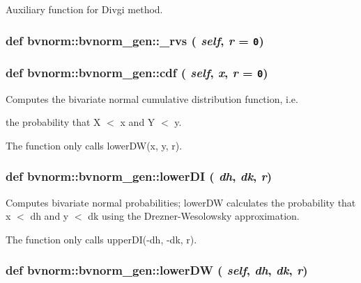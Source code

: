 Auxiliary function for Divgi method. 

\hypertarget{classbvnorm_1_1bvnorm__gen_1f85ab2898c7ce352de4eaa9b47d6817}{
\subsubsection[{\_\-rvs}]{\setlength{\rightskip}{0pt plus 5cm}def bvnorm::bvnorm\_\-gen::\_\-rvs ( {\em self}, \/   {\em r} = {\tt 0})}}
\label{classbvnorm_1_1bvnorm__gen_1f85ab2898c7ce352de4eaa9b47d6817}


\hypertarget{classbvnorm_1_1bvnorm__gen_628377c8e017c5314b8a5ef36db8d892}{
\subsubsection[{cdf}]{\setlength{\rightskip}{0pt plus 5cm}def bvnorm::bvnorm\_\-gen::cdf ( {\em self}, \/   {\em x}, \/   {\em r} = {\tt 0})}}
\label{classbvnorm_1_1bvnorm__gen_628377c8e017c5314b8a5ef36db8d892}


Computes the bivariate normal cumulative distribution function, i.e. 

the probability that X $<$ x and Y $<$ y.

The function only calls lowerDW(x, y, r). \hypertarget{classbvnorm_1_1bvnorm__gen_00b5b765f63ca54c859717b98744d9dc}{
\subsubsection[{lowerDI}]{\setlength{\rightskip}{0pt plus 5cm}def bvnorm::bvnorm\_\-gen::lowerDI ( {\em dh}, \/   {\em dk}, \/   {\em r})}}
\label{classbvnorm_1_1bvnorm__gen_00b5b765f63ca54c859717b98744d9dc}


Computes bivariate normal probabilities; lowerDW calculates the probability that x $<$ dh and y $<$ dk using the Drezner-Wesolowsky approximation. 

The function only calls upperDI(-dh, -dk, r). \hypertarget{classbvnorm_1_1bvnorm__gen_eee6362a2e4206e66e79425e4f5431d5}{
\subsubsection[{lowerDW}]{\setlength{\rightskip}{0pt plus 5cm}def bvnorm::bvnorm\_\-gen::lowerDW ( {\em self}, \/   {\em dh}, \/   {\em dk}, \/   {\em r})}}
\label{classbvnorm_1_1bvnorm__gen_eee6362a2e4206e66e79425e4f5431d5}


